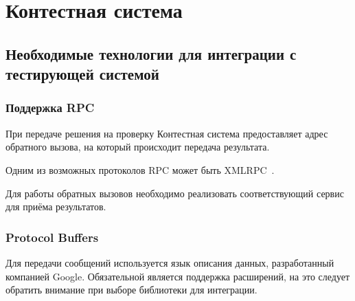 \chapter{Контестная система}

\section{Необходимые технологии для интеграции с тестирующей системой}

\subsection{Поддержка RPC}
При передаче решения на проверку Контестная система предоставляет адрес обратного вызова,
на который происходит передача результата.

Одним из возможных протоколов RPC может быть XMLRPC~\cite{xmlrpc}.

Для работы обратных вызовов необходимо реализовать соответствующий сервис для приёма результатов.

\subsection{Protocol Buffers}
Для передачи сообщений используется язык описания данных, разработанный компанией Google.
Обязательной является поддержка расширений,
на это следует обратить внимание при выборе библиотеки для интеграции.
